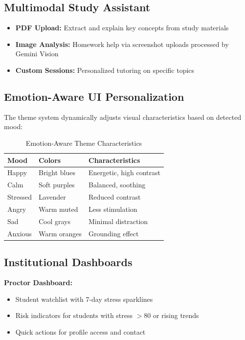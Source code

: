 \documentclass[journal]{IEEEtran}
\begin{document}
\subsection{Multimodal Study Assistant}

\begin{itemize}
    \item \textbf{PDF Upload:} Extract and explain key concepts from study materials
    \item \textbf{Image Analysis:} Homework help via screenshot uploads processed by Gemini Vision
    \item \textbf{Custom Sessions:} Personalized tutoring on specific topics
\end{itemize}

\subsection{Emotion-Aware UI Personalization}

The theme system dynamically adjusts visual characteristics based on detected mood:

\begin{table}[htbp]
\caption{Emotion-Aware Theme Characteristics}
\centering
\begin{tabular}{lll}
\toprule
\textbf{Mood} & \textbf{Colors} & \textbf{Characteristics} \\
\midrule
Happy & Bright blues & Energetic, high contrast \\
Calm & Soft purples & Balanced, soothing \\
Stressed & Lavender & Reduced contrast \\
Angry & Warm muted & Less stimulation \\
Sad & Cool grays & Minimal distraction \\
Anxious & Warm oranges & Grounding effect \\
\bottomrule
\end{tabular}
\end{table}

\subsection{Institutional Dashboards}

\textbf{Proctor Dashboard:}
\begin{itemize}
    \item Student watchlist with 7-day stress sparklines
    \item Risk indicators for students with stress $>80$ or rising trends
    \item Quick actions for profile access and contact
\end{itemize}
\end{document}
